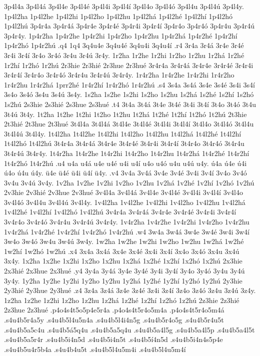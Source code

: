 {3p4l4a 3p4l4^^e1 3p4l4e 3p4l4^^e9 3p4l4i 3p4l4^^ed 3p4l4o 3p4l4^^f3 3p4l4u
3p4l4^^fa 3p4l4y. 1p4l2ha 1p4l2he 1p4l2hi 1p4l2ho 1p4l2hu 1p4l2h^^e1
1p4l2h^^e9 1p4l2h^^ed 1p4l2h^^f3 1p4l2h^^fa
3p4r4a 3p4r4^^e1 3p4r4e 3p4r4^^e9 3p4r4i 3p4r4^^ed 3p4r4o 3p4r4^^f3 3p4r4u
3p4r4^^fa 3p4r4y. 1p4r2ha 1p4r2he 1p4r2hi 1p4r2ho 1p4r2hu 1p4r2h^^e1
1p4r2h^^e9 1p4r2h^^ed 1p4r2h^^f3 1p4r2h^^fa
.q4 1q4 3q4u4e 3q4u4^^e9 3q4u4i 3q4u4^^ed
.r4 3r4a 3r4^^e1 3r4e 3r4^^e9 3r4i 3r4^^ed 3r4o 3r4^^f3 3r4u 3r4^^fa 3r4y.
1r2ha 1r2he 1r2hi 1r2ho 1r2hu 1r2h^^e1 1r2h^^e9 1r2h^^ed 1r2h^^f3 1r2h^^fa
2r3hie 2r3hi^^e9 2r3hue 2r3hu^^e9
3r4r4a 3r4r4^^e1 3r4r4e 3r4r4^^e9 3r4r4i 3r4r4^^ed 3r4r4o 3r4r4^^f3 3r4r4u
3r4r4^^fa 3r4r4y. 1r4r2ha 1r4r2he 1r4r2hi 1r4r2ho 1r4r2hu 1r4r2h^^e1
1prr2h^^e9 1r4r2h^^ed 1r4r2h^^f3 1r4r2h^^fa
.s4 3s4a 3s4^^e1 3s4e 3s4^^e9 3s4i 3s4^^ed 3s4o 3s4^^f3 3s4u 3s4^^fa 3s4y.
1s2ha 1s2he 1s2hi 1s2ho 1s2hu 1s2h^^e1 1s2h^^e9 1s2h^^ed 1s2h^^f3 1s2h^^fa
2s3hie 2s3hi^^e9 2s3hue 2s3hu^^e9
.t4 3t4a 3t4^^e1 3t4e 3t4^^e9 3t4i 3t4^^ed 3t4o 3t4^^f3 3t4u 3t4^^fa 3t4y.
1t2ha 1t2he 1t2hi 1t2ho 1t2hu 1t2h^^e1 1t2h^^e9 1t2h^^ed 1t2h^^f3 1t2h^^fa
2t3hie 2t3hi^^e9 2t3hue 2t3hu^^e9
3t4l4a 3t4l4^^e1 3t4l4e 3t4l4^^e9 3t4l4i 3t4l4^^ed 3t4l4o 3t4l4^^f3 3t4l4u
3t4l4^^fa 3t4l4y. 1t4l2ha 1t4l2he 1t4l2hi 1t4l2ho 1t4l2hu 1t4l2h^^e1
1t4l2h^^e9 1t4l2h^^ed 1t4l2h^^f3 1t4l2h^^fa
3t4r4a 3t4r4^^e1 3t4r4e 3t4r4^^e9 3t4r4i 3t4r4^^ed 3t4r4o 3t4r4^^f3 3t4r4u
3t4r4^^fa 3t4r4y. 1t4r2ha 1t4r2he 1t4r2hi 1t4r2ho 1t4r2hu 1t4r2h^^e1
1t4r2h^^e9 1t4r2h^^ed 1t4r2h^^f3 1t4r2h^^fa
.u4 u4a u4^^e1 u4e u4^^e9 u4i u4^^ed u4o u4^^f3 u4u u4^^fa u4y.
^^fa4a ^^fa4e ^^fa4i ^^fa4o  ^^fa4u ^^fa4y.
^^fc4e ^^fc4^^e9 ^^fc4i ^^fc4^^ed ^^fc4y.
.v4 3v4a 3v4^^e1 3v4e 3v4^^e9 3v4i 3v4^^ed 3v4o 3v4^^f3 3v4u 3v4^^fa 3v4y.
1v2ha 1v2he 1v2hi 1v2ho 1v2hu 1v2h^^e1 1v2h^^e9 1v2h^^ed 1v2h^^f3 1v2h^^fa
2v3hie 2v3hi^^e9 2v3hue 2v3hu^^e9
3v4l4a 3v4l4^^e1 3v4l4e 3v4l4^^e9 3v4l4i 3v4l4^^ed 3v4l4o 3v4l4^^f3 3v4l4u
3v4l4^^fa 3v4l4y. 1v4l2ha 1v4l2he 1v4l2hi 1v4l2ho 1v4l2hu 1v4l2h^^e1
1v4l2h^^e9 1v4l2h^^ed 1v4l2h^^f3 1v4l2h^^fa
3v4r4a 3v4r4^^e1 3v4r4e 3v4r4^^e9 3v4r4i 3v4r4^^ed 3v4r4o 3v4r4^^f3 3v4r4u
3v4r4^^fa 3v4r4y. 1v4r2ha 1v4r2he 1v4r2hi 1v4r2ho 1v4r2hu 1v4r2h^^e1
1v4r2h^^e9 1v4r2h^^ed 1v4r2h^^f3 1v4r2h^^fa
.w4 3w4a 3w4^^e1 3w4e 3w4^^e9 3w4i 3w4^^ed 3w4o 3w4^^f3 3w4u 3w4^^fa 3w4y.
1w2ha 1w2he 1w2hi 1w2ho 1w2hu 1w2h^^e1 1w2h^^e9 1w2h^^ed 1w2h^^f3 1w2h^^fa
.x4 3x4a 3x4^^e1 3x4e 3x4^^e9 3x4i 3x4^^ed 3x4o 3x4^^f3 3x4u 3x4^^fa 3x4y.
1x2ha 1x2he 1x2hi 1x2ho 1x2hu 1x2h^^e1 1x2h^^e9 1x2h^^ed 1x2h^^f3 1x2h^^fa
2x3hie 2x3hi^^e9 2x3hue 2x3hu^^e9
.y4 3y4a 3y4^^e1 3y4e 3y4^^e9 3y4i 3y4^^ed 3y4o 3y4^^f3 3y4u 3y4^^fa 3y4y.
1y2ha 1y2he 1y2hi 1y2ho 1y2hu 1y2h^^e1 1y2h^^e9 1y2h^^ed 1y2h^^f3 1y2h^^fa
2y3hie 2y3hi^^e9 2y3hue 2y3hu^^e9
.z4 3z4a 3z4^^e1 3z4e 3z4^^e9 3z4i 3z4^^ed 3z4o 3z4^^f3 3z4u 3z4^^fa 3z4y.
1z2ha 1z2he 1z2hi 1z2ho 1z2hu 1z2h^^e1 1z2h^^e9 1z2h^^ed 1z2h^^f3 1z2h^^fa
2z3hie 2z3hi^^e9 2z3hue 2z3hu^^e9
%
.p4o4s4t5o5p4e5r4a
.p4o4s4t5r4o5m4a
.p4o4s4t5r4o5m4^^e1
.s4u4b5r4a5y
.s4u4b5l4u5n4a
.s4u4b5l4i4n5g
.s4u4b5r4o5g
.s4u4b5r4u5t
.s4u4b5a5c4u
.s4u4b5^^e15q4u
.s4u4b5a5q4u
.s4u4b5a4l5g
.s4u4b5a4l5p
.s4u4b5a4l5t
.s4u4b5a5r4r
.s4u4b5i4n5d
.s4u4b5i4n5t
.s4u4b5^^ed4n5d
.s4u4b5i4n4s5p4e
.s4u4b5u4r5b4a
.s4u4b4u5t
.s4u4b5l4u5m4i
.s4u4b5l4u5m4^^ed
}
\endgroup
